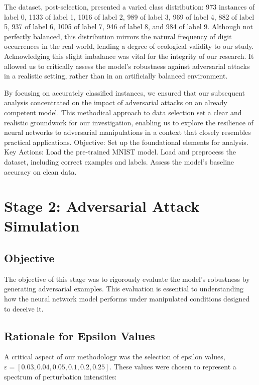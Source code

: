 \documentclass[10pt, conference, a4paper, final]{IEEEtran}
\begin{document}
The dataset, post-selection, presented a varied class distribution: 973 instances of label 0, 1133 of label 1, 1016 of label 2, 989 of label 3, 969 of label 4, 882 of label 5, 937 of label 6, 1005 of label 7, 946 of label 8, and 984 of label 9. Although not perfectly balanced, this distribution mirrors the natural frequency of digit occurrences in the real world, lending a degree of ecological validity to our study. Acknowledging this slight imbalance was vital for the integrity of our research. It allowed us to critically assess the model's robustness against adversarial attacks in a realistic setting, rather than in an artificially balanced environment.

By focusing on accurately classified instances, we ensured that our subsequent analysis concentrated on the impact of adversarial attacks on an already competent model. This methodical approach to data selection set a clear and realistic groundwork for our investigation, enabling us to explore the resilience of neural networks to adversarial manipulations in a context that closely resembles practical applications.
Objective: Set up the foundational elements for analysis.
Key Actions:
Load the pre-trained MNIST model.
Load and preprocess the dataset, including correct examples and labels.
Assess the model's baseline accuracy on clean data.
\section{Stage 2: Adversarial Attack Simulation}

\subsection{Objective}
The objective of this stage was to rigorously evaluate the model's robustness by generating adversarial examples. This evaluation is essential to understanding how the neural network model performs under manipulated conditions designed to deceive it.

\subsection{Rationale for Epsilon Values}

A critical aspect of our methodology was the selection of epsilon values, \( \varepsilon = [0.03,0.04,0.05,0.1, 0.2, 0.25] \). These values were chosen to represent a spectrum of perturbation intensities:
\end{document}
